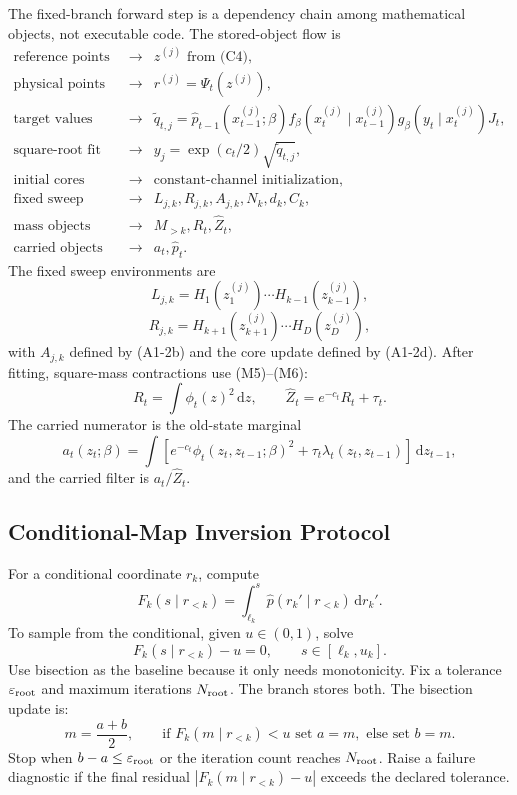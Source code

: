 \documentclass[11pt]{article}
\newcommand{\dd}{\,\mathrm d}
\begin{document}
The fixed-branch forward step is a dependency chain among mathematical
objects, not executable code.  The stored-object flow is
\[
\begin{array}{rcl}
\text{reference points} &\longrightarrow& z^{(j)} \text{ from (C4)},\\
\text{physical points} &\longrightarrow& r^{(j)}=\Psi_t(z^{(j)}),\\
\text{target values} &\longrightarrow&
    \widetilde q_{t,j}
    =
    \widehat p_{t-1}(x_{t-1}^{(j)};\beta)
    f_\beta(x_t^{(j)}\mid x_{t-1}^{(j)})
    g_\beta(y_t\mid x_t^{(j)})J_t,\\
\text{square-root fit values} &\longrightarrow&
    y_j=\exp(c_t/2)\sqrt{\widetilde q_{t,j}},\\
\text{initial cores} &\longrightarrow&
    \text{constant-channel initialization},\\
\text{fixed sweep objects} &\longrightarrow&
    L_{j,k},R_{j,k},A_{j,k},N_k,d_k,C_k,\\
\text{mass objects} &\longrightarrow&
    M_{>k},R_t,\widehat Z_t,\\
\text{carried objects} &\longrightarrow&
    a_t,\widehat p_t.
\end{array}
\tag{C12}
\]
The fixed sweep environments are
\[
    L_{j,k}=H_1(z_1^{(j)})\cdots H_{k-1}(z_{k-1}^{(j)}),
\]
\[
    R_{j,k}=H_{k+1}(z_{k+1}^{(j)})\cdots H_D(z_D^{(j)}),
\]
with \(A_{j,k}\) defined by (A1-2b) and the core update defined by (A1-2d).
After fitting, square-mass contractions use (M5)--(M6):
\[
    R_t=\int\phi_t(z)^2\dd z,\qquad
    \widehat Z_t=e^{-c_t}R_t+\tau_t.
\]
The carried numerator is the old-state marginal
\[
    a_t(z_t;\beta)
    =
    \int
    \left[e^{-c_t}\phi_t(z_t,z_{t-1};\beta)^2
    +\tau_t\lambda_t(z_t,z_{t-1})\right]\dd z_{t-1},
\]
and the carried filter is \(a_t/\widehat Z_t\).

\subsection{Conditional-Map Inversion Protocol}

For a conditional coordinate \(r_k\), compute
\[
    F_k(s\mid r_{<k})
    =
    \int_{\ell_k}^{s}\widehat p(r_k'\mid r_{<k})\dd r_k'.
\]
To sample from the conditional, given \(u\in(0,1)\), solve
\[
    F_k(s\mid r_{<k})-u=0,\qquad s\in[\ell_k,u_k].
\]
Use bisection as the baseline because it only needs monotonicity.  Fix a
tolerance \(\varepsilon_{\rm root}\) and maximum iterations \(N_{\rm root}\).
The branch stores both.  The bisection update is:
\[
    m=\frac{a+b}{2},\qquad
    \text{if }F_k(m\mid r_{<k})<u\text{ set }a=m,\text{ else set }b=m.
\]
Stop when \(b-a\le\varepsilon_{\rm root}\) or the iteration count reaches
\(N_{\rm root}\).  Raise a failure diagnostic if the final residual
\(|F_k(m\mid r_{<k})-u|\) exceeds the declared tolerance.
\end{document}
